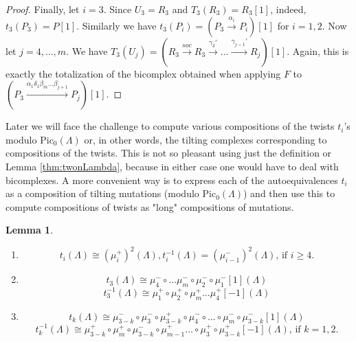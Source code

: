 \documentclass[12pt]{amsart}
\theoremstyle{plain}
\newtheorem{lemma}{Lemma}%
\theoremstyle{remark}
\theoremstyle{definition}
\newcommand{\Pic}{{\mathrm{Pic}}}
\begin{document}
\begin{proof}
Finally, let $i= 3$. Since $U_3 = R_3$ and $T_3(R_3) = R_3[1]$, indeed, $t_3(P_3) = P[1]$. Similarly we have $t_3(P_i) = (P_3 \xrightarrow{\alpha_i} P_i)[1]$ for $i=1,2$. Now let $j = 4, \dots, m$. We have ${T_3(U_j) = (R_3 \xrightarrow{soc} R_3 \xrightarrow{\gamma_3'} 
\dots \xrightarrow{\gamma_{j-1}'} R_j)[1]}$. Again, this is exactly the totalization of the bicomplex obtained when applying $F$ to ${(P_3 \xrightarrow{\alpha_1\delta_1\beta_m \dots \beta_{j+1}} P_j)[1]}$. 
  \end{proof}  

Later we will face the challenge to compute various compositions of the twists $t_i$'s modulo $\Pic_0(\Lambda)$ or, in other words, the tilting complexes corresponding to compositions of the twists. This is not so pleasant using just the definition or Lemma \ref{thm:twonLambda}, because in either case one would have to deal with bicomplexes. A more convenient way is to express each of the autoequivalences $t_i$ as a composition of tilting mutations (modulo $\Pic_0(\Lambda)$) and then use this to compute compositions of twists as "long" compositions of mutations. 

 \begin{lemma}\label{thm:twviamut}  \begin{enumerate}
     \item  
     $$t_i(\Lambda) \cong (\mu_i^+)^2(\Lambda), t_i^{-1}(\Lambda) = (\mu_{i-1}^-)^2(\Lambda), \, \text{if } i \geq 4.$$
      \item  $$t_3(\Lambda) \cong  \mu_4^- \circ \dots \mu_m^- \circ \mu_2^- \circ \mu_1^-[1](\Lambda)$$
$${t_3^{-1}(\Lambda) \cong  \mu_1^+ \circ  \mu_2^+ \circ \mu_m^+ \dots \mu_4^+ [-1](\Lambda)}$$
     \item $$t_k(\Lambda) \cong  \mu_{3-k}^- \circ \mu_{3}^- \circ \mu_{3-k}^+ \circ \mu_4^- \circ \dots \circ \mu_m^- \circ \mu_{3-k}^-[1](\Lambda)$$ $${t_k^{-1}(\Lambda) \cong  \mu_{3-k}^+ \circ \mu_m^+ \circ  \mu_{3-k}^- \circ \mu_{m-1}^+ \dots \circ \mu_3^+ \circ \mu_{3-k}^+[-1](\Lambda)}, \, \text{if } k = 1,2.$$
    
 \end{enumerate} \end{lemma}
\end{document}
